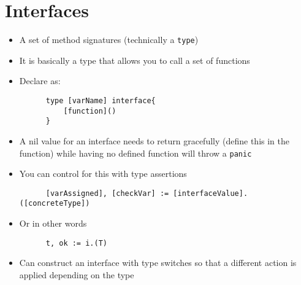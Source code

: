 \documentclass[11pt, oneside]{article}   	%
\begin{document}
\section{Interfaces}
  \begin{itemize}
    \item A set of method signatures (technically a \texttt{type})
    \item It is basically a type that allows you to call a set of functions
    \item Declare as:
    \begin{verbatim}
      type [varName] interface{
          [function]()
      }
    \end{verbatim}
    \item A nil value for an interface needs to return gracefully (define this in the function) while having no defined function will throw a \texttt{panic}
    \item You can control for this with type assertions
    \begin{verbatim}
      [varAssigned], [checkVar] := [interfaceValue].([concreteType])
    \end{verbatim}
    \item Or in other words
      \begin{verbatim}
      t, ok := i.(T)
      \end{verbatim}
    \item Can construct an interface with type switches so that a different action is applied depending on the type
  \end{itemize}
\end{document}
